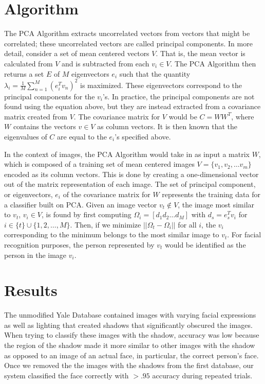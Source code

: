 \documentclass[letterpaper]{article}
\begin{document}
\section{Algorithm}
The PCA Algorithm extracts uncorrelated vectors from vectors
that might be correlated; these uncorrelated vectors are called
principal components. In more detail, consider a set of mean centered
vectors $V$. That is, the mean vector is calculated from $V$ and is subtracted from each $v_i \in V$. The PCA Algorithm then returns
a set $E$ of $M$ eigenvectors $e_i$ such that the quantity
\begin{math}
  \lambda_i = \frac{1}{M} \sum_{n=1}^{M}(e_{i}^{T} v_n)^2
\end{math}
is maximized. These eigenvectors correspond to the principal
components for the $v_i$'s.  In practice, the principal components are
not found using the equation above, but they are instead extracted
from a covariance matrix created from $V$.  The covariance matrix for
$V$ would be $C=WW^T$, where $W$ contains the vectors $v \in V$ as
column vectors. It is then known that the eigenvalues of $C$ are equal to
the $e_i$'s specified above.

In the context of images, the PCA Algorithm would take in as input a
matrix $W$, which is composed of a training set of mean centered images $V = \{v_1, v_2, \ldots
v_m\}$ encoded as
its column vectors.  This is done by creating a one-dimensional vector
out of the matrix representation of each image. The set of principal
component, or eigenvectors, $e_i$ of the covariance matrix for $W$
represents the training data for a classifier built on PCA.  Given an
image vector $v_t \notin V$, the image most similar to $v_t$, $v_i \in V$, is found by first
computing
\begin{math}
  \Omega_i = \left[ d_1 d_2 \ldots d_M \right]
\end{math} 
with $d_s = e_s^T v_i$ for $i \in \{t\} \cup \{1, 2, \ldots, M \}$. Then, if we minimize
\begin{math}
\left| \left| \Omega_t - \Omega_i \right| \right|
\end{math}
for all $i$, the $v_i$ corresponding to the minimum belongs to the
most similar image to $v_t$. For facial recognition purposes, the 
person represented by $v_t$ would be identified as the person in the
image $v_i$.

\section{Results}
The unmodified Yale Database contained images with varying facial expressions as well as lighting that created shadows that significantly obscured the images.  When trying to classify these images with the shadow, accuracy was low because the region of the shadow made it more similar to other images with the shadow as opposed to an image of an actual face, in particular, the correct person's face. Once we removed the the images with the shadows from the first database, our system classified the face correctly with $>.95$ accuracy during repeated trials.
\end{document}
